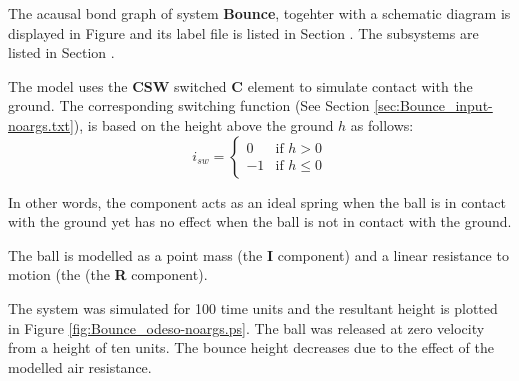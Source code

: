 

   The acausal bond graph of system \textbf{Bounce}, togehter with a
   schematic diagram is
   displayed in Figure  and its label
   file is listed in Section .
   The subsystems are listed in Section .

The model uses the {\bf CSW} switched {\bf C} element to simulate
contact with the ground. The corresponding switching function (See
Section \ref{sec:Bounce_input-noargs.txt}), is based on the height above the
ground $h$ as follows:
\begin{equation}
i_{sw} = 
  \begin{cases}
    0 & \text{if $h > 0$}\\
    -1 & \text{if $h \le 0$}
  \end{cases}
\end{equation}

In other words, the component acts as an ideal spring when the ball is
in contact with the ground yet has no effect when the ball is not in
contact with the ground.

The ball is modelled as a point mass (the \textbf{I} component) and  a
linear resistance to motion (the  (the \textbf{R} component).

The system was simulated for 100 time units and the resultant height
is plotted in Figure \ref{fig:Bounce_odeso-noargs.ps}. The ball was released at zero
velocity from a height of ten units. The bounce height decreases due to
the effect of the modelled air resistance.

